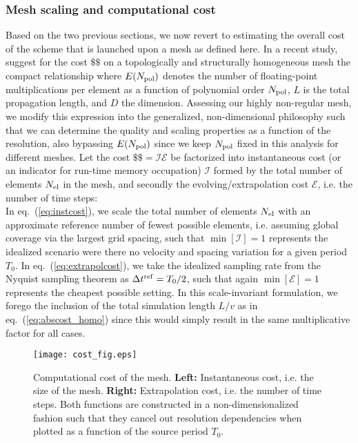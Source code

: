 \subsubsection{Mesh scaling and computational cost}
%
Based on the two previous sections, we now revert to estimating the overall
cost of the scheme that is launched upon a mesh as defined here.
In a recent study, \citet{Ampuero+:07} suggest for the cost
${\$\$}$ on a topologically and structurally homogeneous mesh the
compact relationship
%
\eq\label{eq:abscost_homo}
\en
%
where $E(N_{\rm pol})$ denotes the number of floating-point multiplications per element
as a function of polynomial order $N_{\rm pol}$, $L$ is the total propagation length,
and $D$ the dimension.
Assessing our highly non-regular mesh, we modify this expression into
the generalized, non-dimensional philosophy such that we can
determine the quality and scaling properties as a function of the resolution,
also bypassing $E(N_{\rm pol})$ since we keep $N_{\rm pol}$ fixed in this
analysis for different meshes.
Let the cost $\$\$={\mathcal I}{\mathcal E}$ be factorized into
instantaneous cost (or an indicator for run-time memory occupation)
${\mathcal I}$ formed by the total number of elements $N_{\rm el}$ in the mesh,
and secondly the evolving/extrapolation cost ${\mathcal E}$,
i.e. the number of time steps:
%
\eqa
{} \label{eq:instcost}\\
\label{eq:extrapolcost}%
\ena
%
In eq.~(\ref{eq:instcost}), we scale the total number of elements $N_{\rm el}$ with an approximate
reference number of fewest possible elements,
i.e. assuming global coverage via the largest grid spacing, such that $\min[{\mathcal I}]=1$
represents the idealized scenario were there no velocity and spacing variation for a given period $T_0$.
In eq.~(\ref{eq:extrapolcost}), we take the idealized sampling rate from the Nyquist sampling
theorem as $\Delta{t}^{\rm ref}=T_0/2$, such that again $\min[{\mathcal E}]=1$ represents the
cheapest possible setting. In this scale-invariant formulation, we forego the inclusion of the total
simulation length $L/v$ as in eq.~(\ref{eq:abscost_homo}) since this would simply result in the
same multiplicative factor for all cases.
%
\begin{figure}[tb!]
\begin{center}
\texttt{[image: cost\_fig.eps]}
\caption{Computational cost of the mesh. \textbf{Left:} Instantaneous cost, i.e. the
size of the mesh. \textbf{Right:} Extrapolation cost, i.e. the number of time steps.
Both functions are constructed in a non-dimensionalized fashion
such that they cancel out resolution dependencies when
plotted as a function of the source period $T_0$.}
\label{img:cost}
\end{center}
\end{figure}
